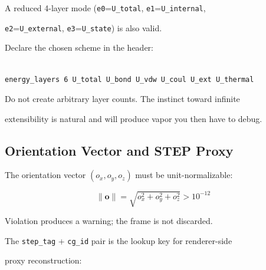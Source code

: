 \documentclass[12pt, a4paper, oneside]{article}
\begin{document}
A reduced 4-layer mode (\texttt{e0}=\texttt{U\_total}, \texttt{e1}=\texttt{U\_internal},

\texttt{e2}=\texttt{U\_external}, \texttt{e3}=\texttt{U\_state}) is also valid.

Declare the chosen scheme in the header:


\begin{lstlisting}[language={},frame=single]

energy_layers 6 U_total U_bond U_vdw U_coul U_ext U_thermal

\end{lstlisting}


Do not create arbitrary layer counts.  The instinct toward infinite

extensibility is natural and will produce vapor you then have to debug.


\subsection{Orientation Vector and STEP Proxy}


The orientation vector $(o_x, o_y, o_z)$ must be unit-normalizable:

\begin{equation}

  \|\mathbf{o}\| = \sqrt{o_x^2 + o_y^2 + o_z^2} > 10^{-12}

  \label{eq:orient}

\end{equation}


Violation produces a warning; the frame is not discarded.


The \texttt{step\_tag} + \texttt{cg\_id} pair is the lookup key for renderer-side

proxy reconstruction:
\end{document}
